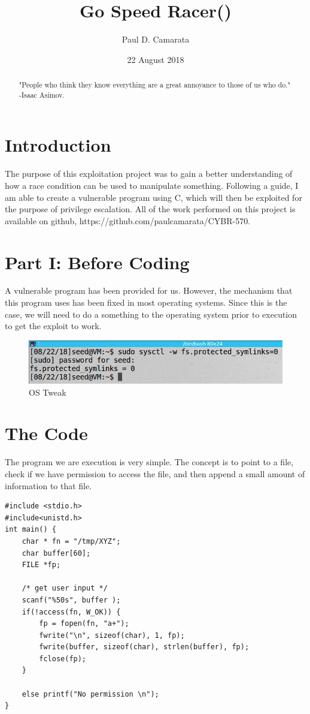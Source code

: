 \documentclass[10pt]{article}
\begin{document}
\title{Go Speed Racer()}
\author{Paul D. Camarata}
\date{22 August 2018}

\maketitle
\pagebreak
\begin{abstract}
"People who think they know everything are a great annoyance to those of us who do."
-Isaac Asimov.
\end{abstract}

\section{Introduction}
The purpose of this exploitation project was to gain a better understanding of how a race condition can be used to manipulate something.  Following a guide, I am able to create a vulnerable program using C, which will then be exploited for the purpose of privilege escalation.  All of the work performed on this project is available on github, https://github.com/paulcamarata/CYBR-570.

\section{Part I: Before Coding}
A vulnerable program has been provided for us.  However, the mechanism that this program uses has been fixed in most operating systems.  Since this is the case, we will need to do a something to the operating system prior to execution to get the exploit to work.  

\begin{figure}[H]
\centering
\includegraphics[scale=0.5]{./images/ss01.png}
\caption{OS Tweak}
\label{fig:Code}
\end{figure}

\section{The Code}
The program we are execution is very simple.  The concept is to point to a file, check if we have permission to access the file, and then append a small amount of information to that file.  

\begin{verbatim}
#include <stdio.h>
#include<unistd.h>
int main() {
    char * fn = "/tmp/XYZ";
    char buffer[60];
    FILE *fp;

    /* get user input */
    scanf("%50s", buffer );
    if(!access(fn, W_OK)) {
        fp = fopen(fn, "a+");
        fwrite("\n", sizeof(char), 1, fp);
        fwrite(buffer, sizeof(char), strlen(buffer), fp);
        fclose(fp);
    }

    else printf("No permission \n");
}
\end{verbatim}
\end{document}
